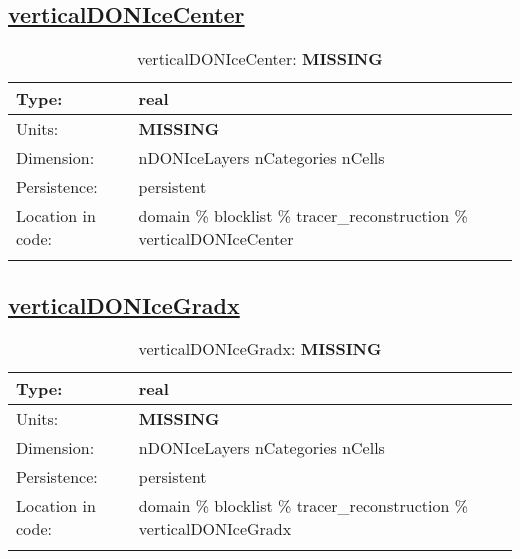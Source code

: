 \subsection[verticalDONIceCenter]{\hyperref[sec:var_tab_tracer_reconstruction]{verticalDONIceCenter}}
\label{subsec:var_sec_tracer_reconstruction_verticalDONIceCenter}
\begin{center}
\begin{longtable}{| p{2.0in} | p{4.0in} |}
        \hline 
        Type: & real \\
        \hline 
        Units: & {\bf \color{red} MISSING} \\
        \hline 
        Dimension: & nDONIceLayers nCategories nCells \\
        \hline 
        Persistence: & persistent \\
        \hline 
         Location in code: & domain \% blocklist \% tracer\_reconstruction \% verticalDONIceCenter \\
         \hline 
    \caption{verticalDONIceCenter: {\bf \color{red} MISSING}}
\end{longtable}
\end{center}
\subsection[verticalDONIceGradx]{\hyperref[sec:var_tab_tracer_reconstruction]{verticalDONIceGradx}}
\label{subsec:var_sec_tracer_reconstruction_verticalDONIceGradx}
\begin{center}
\begin{longtable}{| p{2.0in} | p{4.0in} |}
        \hline 
        Type: & real \\
        \hline 
        Units: & {\bf \color{red} MISSING} \\
        \hline 
        Dimension: & nDONIceLayers nCategories nCells \\
        \hline 
        Persistence: & persistent \\
        \hline 
         Location in code: & domain \% blocklist \% tracer\_reconstruction \% verticalDONIceGradx \\
         \hline 
    \caption{verticalDONIceGradx: {\bf \color{red} MISSING}}
\end{longtable}
\end{center}
